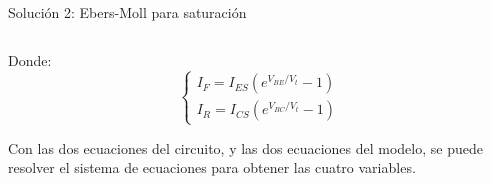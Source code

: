 \documentclass[t,aspectratio=169]{beamer}
\begin{document}
\begin{frame}{Solución 2: Ebers-Moll para saturación}
\begin{columns}
\begin{column}{0.5\textwidth}
Donde:
\begin{equation*}
\begin{cases}
I_F = I_{ES} (e^{V_{BE}/V_t} - 1) \\
I_R = I_{CS} (e^{V_{BC}/V_t} - 1)
\end{cases}
\end{equation*}

Con las dos ecuaciones del circuito, y las dos ecuaciones del modelo, se puede resolver el sistema de ecuaciones para obtener las cuatro variables.

\end{column}

\end{columns}

\end{frame}
\end{document}
